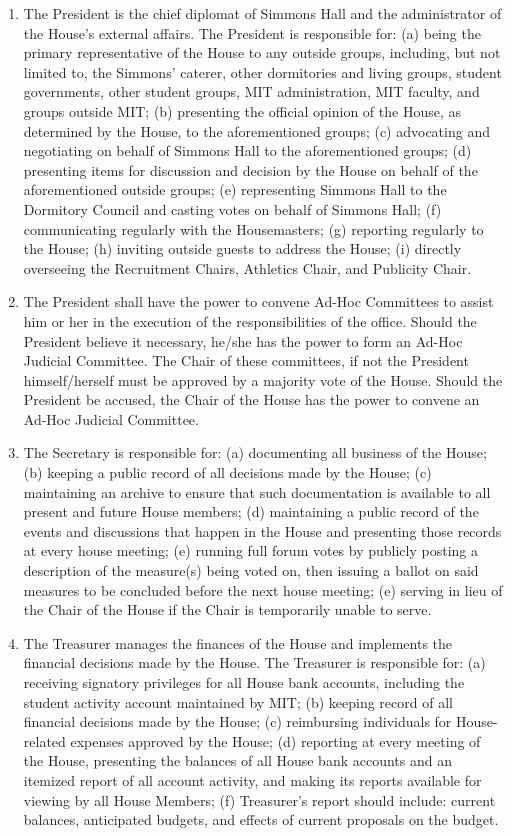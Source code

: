 \documentclass[letterpaper]{article}
\begin{document}
\begin{enumerate}
\begin{enumerate}
\begin{enumerate}
\item The President is the chief diplomat of Simmons Hall and the administrator of the House's external affairs. The President is responsible for: (a) being the primary representative of the House to any outside groups, including, but not limited to, the Simmons' caterer, other dormitories and living groups, student governments, other student groups, MIT administration, MIT faculty, and groups outside MIT; (b) presenting the official opinion of the House, as determined by the House, to the aforementioned groups; (c) advocating and negotiating on behalf of Simmons Hall to the aforementioned groups; (d) presenting items for discussion and decision by the House on behalf of the aforementioned outside groups; (e) representing Simmons Hall to the Dormitory Council and casting votes on behalf of Simmons Hall; (f) communicating regularly with the Housemasters; (g) reporting regularly to the House; (h) inviting outside guests to address the House; (i) directly overseeing the Recruitment Chairs, Athletics Chair, and Publicity Chair.

\item The President shall have the power to convene Ad-Hoc Committees to assist him or her in the execution of the responsibilities of the office. Should the President believe it necessary, he/she has the power to form an Ad-Hoc Judicial Committee. The Chair of these committees, if not the President himself/herself must be approved by a majority vote of the House. Should the President be accused, the Chair of the House has the power to convene an Ad-Hoc Judicial Committee.

\item The Secretary is responsible for: (a) documenting all business of the House; (b) keeping a public record of all decisions made by the House; (c) maintaining an archive to ensure that such documentation is available to all present and future House members; (d) maintaining a public record of the events and discussions that happen in the House and presenting those records at every house meeting; (e) running full forum votes by publicly posting a description of the measure(s) being voted on, then issuing a ballot on said measures to be concluded before the next house meeting; (e) serving in lieu of the Chair of the House if the Chair is temporarily unable to serve.

\item The Treasurer manages the finances of the House and implements the financial decisions made by the House. The Treasurer is responsible for: (a) receiving signatory privileges for all House bank accounts, including the student activity account maintained by MIT; (b) keeping record of all financial decisions made by the House; (c) reimbursing individuals for House-related expenses approved by the House; (d) reporting at every meeting of the House, presenting the balances of all
House bank accounts and an itemized report of all account activity, and making its reports available for viewing by all House Members; (f) Treasurer's report should include: current balances, anticipated budgets, and effects of current proposals on the budget.


\end{enumerate}
\end{enumerate}
\end{enumerate}
\end{document}
